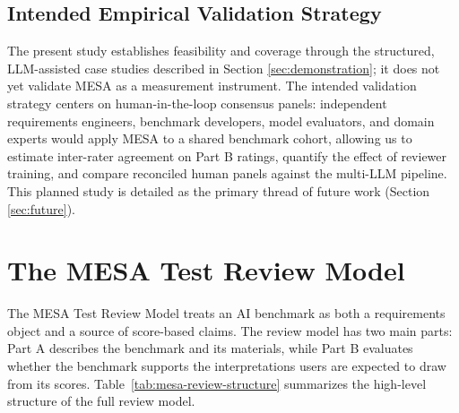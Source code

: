 \documentclass[conference]{IEEEtran}
\begin{document}
    \subsection{Intended Empirical Validation Strategy}
    
        The present study establishes feasibility and coverage through the structured, LLM-assisted case studies described in Section \ref{sec:demonstration}; it does not yet validate MESA as a measurement instrument. The intended validation strategy centers on human-in-the-loop consensus panels: independent requirements engineers, benchmark developers, model evaluators, and domain experts would apply MESA to a shared benchmark cohort, allowing us to estimate inter-rater agreement on Part B ratings, quantify the effect of reviewer training, and compare reconciled human panels against the multi-LLM pipeline. This planned study is detailed as the primary thread of future work (Section \ref{sec:future}).
    
\section{The MESA Test Review Model}
    
    The MESA Test Review Model treats an AI benchmark as both a requirements object and a source of score-based claims. The review model has two main parts: Part A describes the benchmark and its materials, while Part B evaluates whether the benchmark supports the interpretations users are expected to draw from its scores. Table~\ref{tab:mesa-review-structure} summarizes the high-level structure of the full review model.
    
\end{document}
